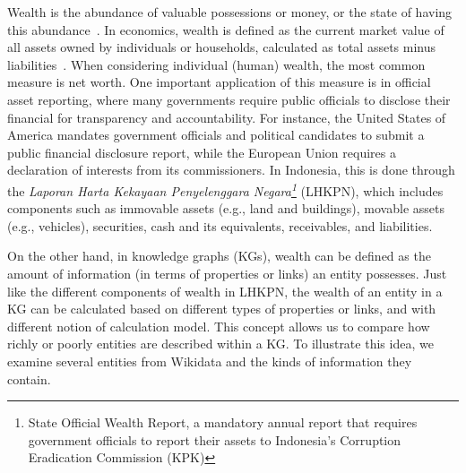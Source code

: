 
Wealth is the abundance of valuable possessions or money, or the state of having this abundance~\cite{wealthOed}. In economics, wealth is defined as the current market value of all assets owned by individuals or households, calculated as total assets minus liabilities~\cite{SaezG16}. When considering individual (human) wealth, the most common measure is net worth. One important application of this measure is in official asset reporting, where many governments require public officials to disclose their financial for transparency and accountability. For instance, the United States of America mandates government officials and political candidates to submit a public financial disclosure report, while the European Union requires a declaration of interests from its commissioners. In Indonesia, this is done through the \textit{Laporan Harta Kekayaan Penyelenggara Negara\footnote{State Official Wealth Report, a mandatory annual report that requires government officials to report their assets to Indonesia's Corruption Eradication Commission (KPK)}} (LHKPN), which includes components such as immovable assets (e.g., land and buildings), movable assets (e.g., vehicles), securities, cash and its equivalents, receivables, and liabilities.

On the other hand, in knowledge graphs (KGs), wealth can be defined as the amount of information (in terms of properties or links) an entity possesses. Just like the different components of wealth in LHKPN, the wealth of an entity in a KG can be calculated based on different types of properties or links, and with different notion of calculation model. This concept allows us to compare how richly or poorly entities are described within a KG. To illustrate this idea, we examine several entities from Wikidata and the kinds of information they contain.

